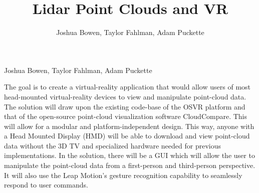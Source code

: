 \documentclass{article}
\begin{document}
\title{Lidar Point Clouds and VR}
\author{Joshua Bowen, Taylor Fahlman, Adam Puckette}

{\centering
Joshua Bowen, Taylor Fahlman, Adam Puckette\\\par
}

\abstract

The goal is to create a virtual-reality application that would allow users of most head-mounted virtual-reality devices to view and manipulate point-cloud data. The solution will draw upon the existing code-base of the OSVR platform and that of the open-source point-cloud visualization software CloudCompare. This will allow for a modular and platform-independent design. This way, anyone with a Head Mounted Display (HMD) will be able to download and view point-cloud data without the 3D TV and specialized hardware needed for previous implementations. In the solution, there will be a GUI which will allow the user to manipulate the point-cloud data from a first-person and third-person perspective. It will also use the Leap Motion's gesture recognition capability to seamlessly respond to user commands.
\end{document}

